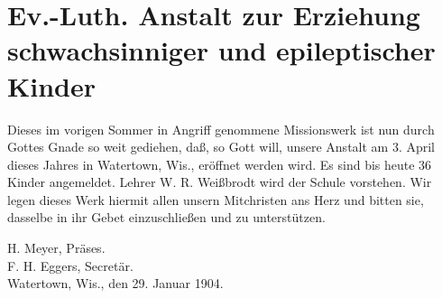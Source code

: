 \chapter[Ev.-Luth. Anstalt zur Erziehung schwachsinniger Kinder]{Ev.-Luth. Anstalt zur Erziehung schwachsinniger und epileptischer Kinder}

Dieses im vorigen Sommer in Angriff genommene Missionswerk ist nun durch Gottes Gnade so weit gediehen, daß, so Gott will, unsere Anstalt am 3. April dieses Jahres in Watertown, Wis., eröffnet werden wird. Es sind bis heute 36 Kinder angemeldet. Lehrer W. R. Weißbrodt wird der Schule vorstehen. Wir legen dieses Werk hiermit allen unsern Mitchristen ans Herz und bitten sie, dasselbe in ihr Gebet einzuschließen und zu unterstützen.

\begin{unterschrift}
H. Meyer, Präses.\\
F. H. Eggers, Secretär.\\
Watertown, Wis., den 29. Januar 1904.
\end{unterschrift}
